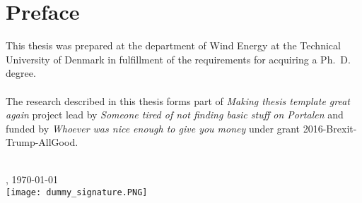 \chapter{Preface}
This thesis was prepared at the department of Wind Energy at the Technical University of Denmark in fulfillment of the requirements for acquiring a Ph.~D. degree.
\\\\
The research described in this thesis forms part of \textit{Making thesis template great again} project lead by \textit{Someone tired of not finding basic stuff on Portalen} and funded by \textit{Whoever was nice enough to give you money} under grant 2016-Brexit-Trump-AllGood.
\\\\
\begin{comment}
    The present document is the result of three years of work MES/TEM ...
    
    Your personal background (in brief)
    Your personal experiences or the circumstances that motivated you to write your thesis (in brief)
    The target group for which your thesis was written
    The division of labor (when the thesis has been written by more than one person)
    Acknowledgements to individuals and institutions who have helped you in the writing and checking of the thesis
\end{comment}
\vfill

{
\flushright
    \thesislocation{}, \today\\[1cm]
    \hspace{3cm}\texttt{[image: dummy\_signature.PNG]}\\[1cm]
\begin{flushright}
    \thesisauthor{}
\end{flushright}
}
